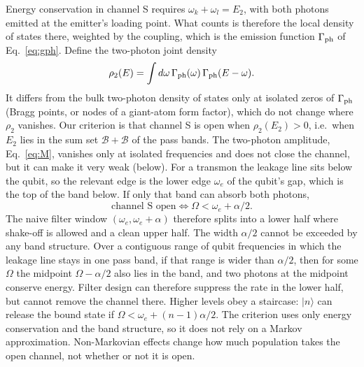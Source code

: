 \documentclass[aps,prresearch,twocolumn,superscriptaddress,nofootinbib,longbibliography,floatfix]{revtex4-2}
\begin{document}
Energy conservation in channel S requires $\omega_k+\omega_l=E_2$, with both photons emitted at the emitter's loading
point. What counts is therefore the local density of states there, weighted by the coupling, which is the emission
function $\Gamma_{\rm ph}$ of Eq.~\eqref{eq:gph}. Define the two-photon joint density
\begin{equation}
\rho_2(E)=\int d\omega\,\Gamma_{\rm ph}(\omega)\,\Gamma_{\rm ph}(E-\omega).
\end{equation}
It differs from the bulk two-photon density of states only at isolated zeros of $\Gamma_{\rm ph}$ (Bragg points, or
nodes of a giant-atom form factor), which do not change where $\rho_2$ vanishes. Our criterion is that channel S is open
when $\rho_2(E_2)>0$, i.e.\ when $E_2$ lies in the sum set $\mathcal B+\mathcal B$ of the pass bands. The two-photon
amplitude, Eq.~\eqref{eq:M}, vanishes only at isolated frequencies and does not close the channel, but it can make
it very weak (below). For a transmon the leakage line sits below the qubit, so the relevant edge is the lower edge $\omega_e$ of the
qubit's gap, which is the top of the band below. If only that band can absorb both photons,
\begin{equation}
\text{channel S open}\iff\Omega<\omega_e+\alpha/2 .
\label{eq:threshold}
\end{equation}
The naive filter window $(\omega_e,\omega_e+\alpha)$ therefore splits into a lower half where shake-off is allowed and a
clean upper half. The width $\alpha/2$ cannot be exceeded by any band structure. Over a contiguous range of qubit
frequencies in which the leakage line stays in one pass band, if that range is wider than $\alpha/2$, then for some
$\Omega$ the midpoint $\Omega-\alpha/2$ also lies in the band, and two photons at the midpoint conserve energy. Filter
design can therefore suppress the rate in the lower half, but cannot remove the channel there. Higher levels obey a staircase: $|n\rangle$ can release the bound state if
$\Omega<\omega_e+(n-1)\alpha/2$. The criterion uses only energy conservation and the band structure, so it does not
rely on a Markov approximation. Non-Markovian effects change how much population takes the open channel, not whether or not it is open.
\end{document}
